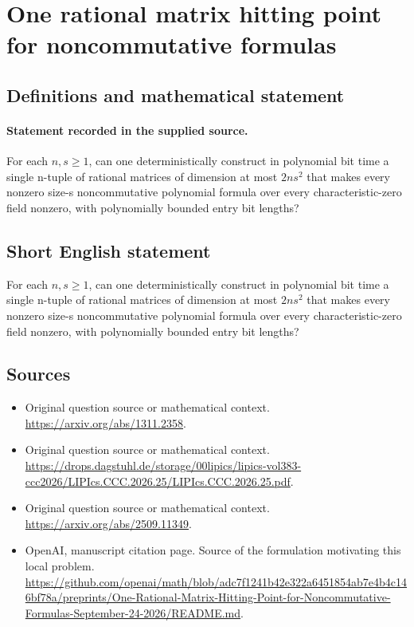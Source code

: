 \documentclass[11pt]{article}
\begin{document}
\section*{One rational matrix hitting point for noncommutative formulas}\label{statement}
\subsection{Definitions and mathematical statement}
\paragraph{Statement recorded in the supplied source.}
For each $n,s\geq 1$, can one deterministically construct in polynomial bit time a single n-tuple of rational matrices of dimension at most $2ns^{2}$ that makes every nonzero size-s noncommutative polynomial formula over every characteristic-zero field nonzero, with polynomially bounded entry bit lengths?
\subsection{Short English statement}
For each $n,s\geq 1$, can one deterministically construct in polynomial bit time a single n-tuple of rational matrices of dimension at most $2ns^{2}$ that makes every nonzero size-s noncommutative polynomial formula over every characteristic-zero field nonzero, with polynomially bounded entry bit lengths?
\subsection{Sources}
\begin{itemize}
\item[S1] Original question source or mathematical context.
\url{https://arxiv.org/abs/1311.2358}.
\item[S2] Original question source or mathematical context.
\url{https://drops.dagstuhl.de/storage/00lipics/lipics-vol383-ccc2026/LIPIcs.CCC.2026.25/LIPIcs.CCC.2026.25.pdf}.
\item[S3] Original question source or mathematical context.
\url{https://arxiv.org/abs/2509.11349}.
\item[S4] OpenAI, manuscript citation page. Source of the formulation motivating this local problem.
\url{https://github.com/openai/math/blob/adc7f1241b42e322a6451854ab7e4b4c146bf78a/preprints/One-Rational-Matrix-Hitting-Point-for-Noncommutative-Formulas-September-24-2026/README.md}.
\end{itemize}
\end{document}
